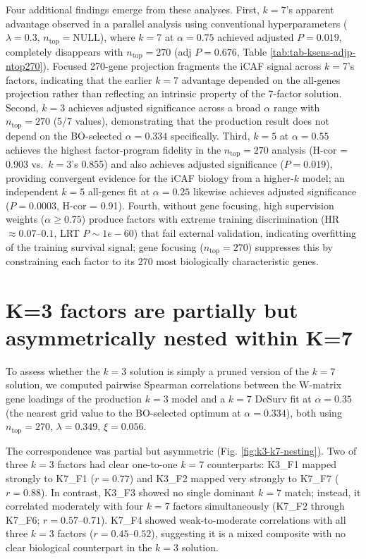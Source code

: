 \documentclass[
]{article}
\begin{document}
Four additional findings emerge from these analyses. First, \(k = 7\)'s
apparent advantage observed in a parallel analysis using conventional
hyperparameters (\(\lambda=0.3\), \(n_{\text{top}} = \text{NULL}\)),
where \(k = 7\) at \(\alpha=0.75\) achieved adjusted \(P = 0.019\),
completely disappears with \(n_{\text{top}} = 270\) (adj \(P = 0.676\),
Table \ref{tab:tab-ksens-adjp-ntop270}). Focused 270-gene projection
fragments the iCAF signal across \(k = 7\)'s factors, indicating that
the earlier \(k = 7\) advantage depended on the all-genes projection
rather than reflecting an intrinsic property of the 7-factor solution.
Second, \(k = 3\) achieves adjusted significance across a broad
\(\alpha\) range with \(n_{\text{top}} = 270\) (5/7 values),
demonstrating that the production result does not depend on the
BO-selected \(\alpha = 0.334\) specifically. Third, \(k = 5\) at
\(\alpha=0.55\) achieves the highest factor-program fidelity in the
\(n_{\text{top}} = 270\) analysis (H-cor = 0.903 vs.~\(k = 3\)'s 0.855)
and also achieves adjusted significance (\(P = 0.019\)), providing
convergent evidence for the iCAF biology from a higher-\(k\) model; an
independent \(k = 5\) all-genes fit at \(\alpha=0.25\) likewise achieves
adjusted significance (\(P = 0.0003\), H-cor = 0.91). Fourth, without
gene focusing, high supervision weights (\(\alpha \geq 0.75\)) produce
factors with extreme training discrimination (HR
\(\approx 0.07\)--\(0.1\), LRT \(P \sim 1e-60\)) that fail external
validation, indicating overfitting of the training survival signal; gene
focusing (\(n_{\text{top}} = 270\)) suppresses this by constraining each
factor to its 270 most biologically characteristic genes.

\section{K=3 factors are partially but asymmetrically nested within
K=7}\label{k3-factors-are-partially-but-asymmetrically-nested-within-k7}

To assess whether the \(k = 3\) solution is simply a pruned version of
the \(k = 7\) solution, we computed pairwise Spearman correlations
between the W-matrix gene loadings of the production \(k = 3\) model and
a \(k = 7\) DeSurv fit at \(\alpha = 0.35\) (the nearest grid value to
the BO-selected optimum at \(\alpha = 0.334\)), both using
\(n_{\text{top}} = 270\), \(\lambda = 0.349\), \(\xi = 0.056\).

The correspondence was partial but asymmetric (Fig.
\ref{fig:k3-k7-nesting}). Two of three \(k = 3\) factors had clear
one-to-one \(k = 7\) counterparts: K3\_F1 mapped strongly to K7\_F1
(\(r = 0.77\)) and K3\_F2 mapped very strongly to K7\_F7 (\(r = 0.88\)).
In contrast, K3\_F3 showed no single dominant \(k = 7\) match; instead,
it correlated moderately with four \(k = 7\) factors simultaneously
(K7\_F2 through K7\_F6; \(r = 0.57\)--\(0.71\)). K7\_F4 showed
weak-to-moderate correlations with all three \(k = 3\) factors
(\(r = 0.45\)--\(0.52\)), suggesting it is a mixed composite with no
clear biological counterpart in the \(k = 3\) solution.
\end{document}

